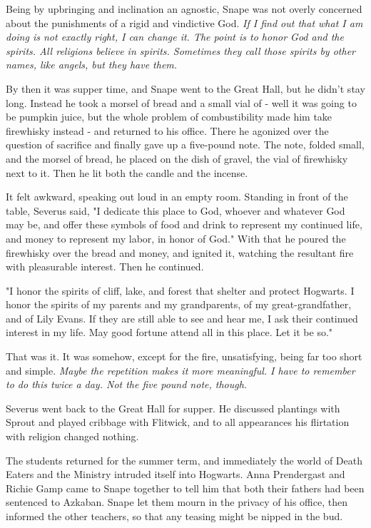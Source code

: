 Being by upbringing and inclination an agnostic, Snape was not overly concerned about the punishments of a rigid and vindictive God. \emph{If I find out that what I am doing is not exactly right, I can change it. The point is to honor God and the spirits. All religions believe in spirits. Sometimes they call those spirits by other names, like angels, but they have them.}

By then it was supper time, and Snape went to the Great Hall, but he didn't stay long. Instead he took a morsel of bread and a small vial of - well it was going to be pumpkin juice, but the whole problem of combustibility made him take firewhisky instead - and returned to his office. There he agonized over the question of sacrifice and finally gave up a five-pound note. The note, folded small, and the morsel of bread, he placed on the dish of gravel, the vial of firewhisky next to it. Then he lit both the candle and the incense.

It felt awkward, speaking out loud in an empty room. Standing in front of the table, Severus said, "I dedicate this place to God, whoever and whatever God may be, and offer these symbols of food and drink to represent my continued life, and money to represent my labor, in honor of God." With that he poured the firewhisky over the bread and money, and ignited it, watching the resultant fire with pleasurable interest. Then he continued.

"I honor the spirits of cliff, lake, and forest that shelter and protect Hogwarts. I honor the spirits of my parents and my grandparents, of my great-grandfather, and of Lily Evans. If they are still able to see and hear me, I ask their continued interest in my life. May good fortune attend all in this place. Let it be so."

That was it. It was somehow, except for the fire, unsatisfying, being far too short and simple. \emph{Maybe the repetition makes it more meaningful. I have to remember to do this twice a day. Not the five pound note, though.}

Severus went back to the Great Hall for supper. He discussed plantings with Sprout and played cribbage with Flitwick, and to all appearances his flirtation with religion changed nothing.

The students returned for the summer term, and immediately the world of Death Eaters and the Ministry intruded itself into Hogwarts. Anna Prendergast and Richie Gamp came to Snape together to tell him that both their fathers had been sentenced to Azkaban. Snape let them mourn in the privacy of his office, then informed the other teachers, so that any teasing might be nipped in the bud.


